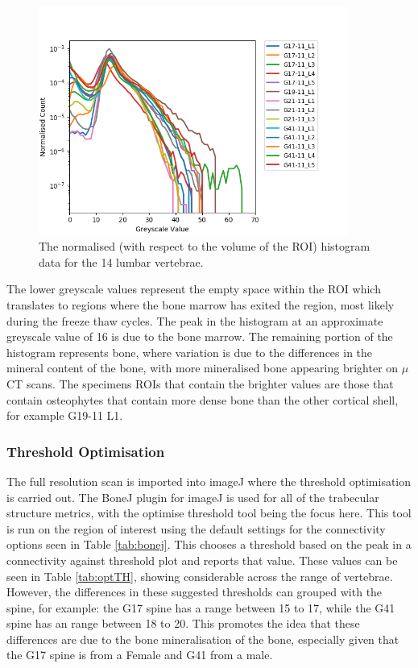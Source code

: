 \begin{figure}[ht!]
  \centering
  \includegraphics[width=4in]{Chapters/Chapter_HT_images/Normalised_Histogram.png}
  \caption{The normalised (with respect to the volume of the ROI) histogram data
    for the 14 lumbar vertebrae.}
  \label{fig:normalisedhistogram}
\end{figure}

The lower greyscale values represent the empty space within the ROI which
translates to regions where the bone marrow has exited the region, most likely
during the freeze thaw cycles. The peak in the histogram at an approximate
greyscale value of 16 is due to the bone marrow. The remaining portion of the
histogram represents bone, where variation is due to the differences in the
mineral content of the bone, with more mineralised bone appearing brighter on
$\mu$CT scans. The specimens ROIs that contain the brighter values are those
that contain osteophytes that contain more dense bone than the other cortical
shell, for example G19-11 L1.

\subsubsection{Threshold Optimisation}\label{th_opt}


The full resolution scan is imported into imageJ where the threshold optimisation is carried out.
The BoneJ plugin for imageJ is used for all of the trabecular structure metrics, with the optimise threshold tool being the focus here.
This tool is run on the region of interest using the default settings for the connectivity options seen in Table \ref{tab:bonej}.
This chooses a threshold based on the peak in a connectivity against threshold plot and reports that value.
These values can be seen in Table \ref{tab:optTH}, showing considerable across the range of vertebrae.
However, the differences in these suggested thresholds can grouped with the spine, for example: the G17 spine has a range between 15 to 17, while the G41 spine has an range between 18 to 20.
This promotes the idea that these differences are due to the bone mineralisation of the bone, especially given that the G17 spine is from a Female and G41 from a male.

